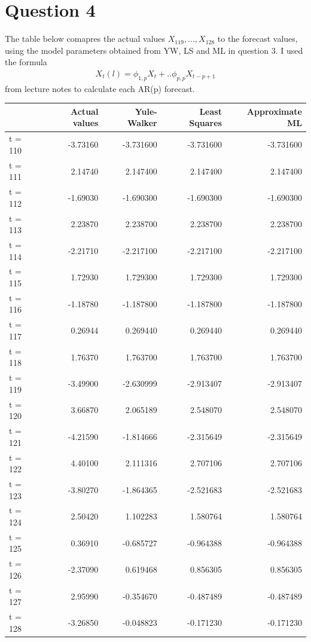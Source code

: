 \documentclass[a4paper,10pt]{article}
\theoremstyle{mytheor}
\begin{document}
\clearpage
\section*{Question 4}

The table below comapres the actual values $X_119,...,  X_128$ to the forecast values, using the model parameters obtained from YW, LS and ML in question 3. I used the formula
\begin{align*}
    X_t(l) = \phi_{1,p}X_t + .. \phi_{p,p}X_{t-p+1}
\end{align*}
from lecture notes to calculate each AR(p) forecast. \\

\begin{tabular}{lrrrr}
\toprule
{} &  Actual values &  Yule-Walker &  Least Squares &   Approximate ML \\
\midrule
t = 110 & -3.73160 & -3.731600 & -3.731600 & -3.731600 \\
t = 111 &  2.14740 &  2.147400 &  2.147400 &  2.147400 \\
t = 112 & -1.69030 & -1.690300 & -1.690300 & -1.690300 \\
t = 113 &  2.23870 &  2.238700 &  2.238700 &  2.238700 \\
t = 114 & -2.21710 & -2.217100 & -2.217100 & -2.217100 \\
t = 115 &  1.72930 &  1.729300 &  1.729300 &  1.729300 \\
t = 116 & -1.18780 & -1.187800 & -1.187800 & -1.187800 \\
t = 117 &  0.26944 &  0.269440 &  0.269440 &  0.269440 \\
t = 118 &  1.76370 &  1.763700 &  1.763700 &  1.763700 \\
t = 119 & -3.49900 & -2.630999 & -2.913407 & -2.913407 \\
t = 120 &  3.66870 &  2.065189 &  2.548070 &  2.548070 \\
t = 121 & -4.21590 & -1.814666 & -2.315649 & -2.315649 \\
t = 122 &  4.40100 &  2.111316 &  2.707106 &  2.707106 \\
t = 123 & -3.80270 & -1.864365 & -2.521683 & -2.521683 \\
t = 124 &  2.50420 &  1.102283 &  1.580764 &  1.580764 \\
t = 125 &  0.36910 & -0.685727 & -0.964388 & -0.964388 \\
t = 126 & -2.37090 &  0.619468 &  0.856305 &  0.856305 \\
t = 127 &  2.95990 & -0.354670 & -0.487489 & -0.487489 \\
t = 128 & -3.26850 & -0.048823 & -0.171230 & -0.171230 \\
\bottomrule
\end{tabular} \\
\end{document}

